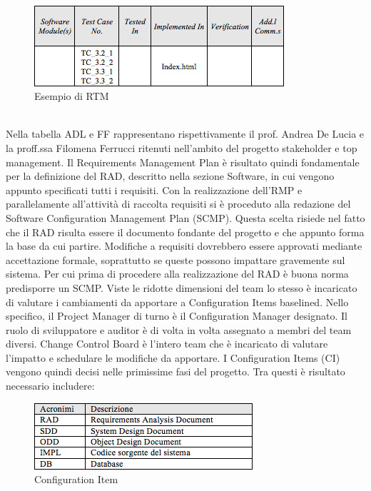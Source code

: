\\
\begin{figure}[h]
\centering
\includegraphics[scale=.7]{img/4.png}
\caption{Esempio di RTM}
\label{fig:cd}
\end{figure}
\\
Nella tabella ADL e FF rappresentano rispettivamente il prof. Andrea De Lucia e la proff.ssa Filomena Ferrucci ritenuti nell\rq ambito del progetto stakeholder e top management.
Il Requirements Management Plan \`{e} risultato quindi fondamentale per la definizione del RAD, descritto nella sezione Software, in cui vengono appunto specificati tutti i requisiti.
Con la realizzazione dell\rq RMP e parallelamente all\rq attivit\`{a} di raccolta requisiti si \`{e} proceduto alla redazione del Software Configuration Management Plan (SCMP). Questa scelta risiede nel fatto che il RAD risulta essere il documento fondante del progetto e che appunto forma la base da cui partire. Modifiche a requisiti dovrebbero essere approvati mediante accettazione formale, soprattutto se queste possono impattare gravemente sul sistema.
Per cui prima di procedere alla realizzazione del RAD \`{e} buona norma predisporre un SCMP. 
Viste le ridotte dimensioni del team lo stesso \`{e} incaricato di valutare i cambiamenti da apportare a Configuration Items baselined.
Nello specifico, il Project Manager di turno \`{e} il Configuration Manager designato. Il ruolo di sviluppatore e auditor \`{e} di volta in volta assegnato a membri del team diversi.
Change Control Board \`{e} l\rq intero team che \`{e} incaricato di valutare l\rq impatto e schedulare le modifiche da apportare.
I Configuration Items (CI) vengono quindi decisi nelle primissime fasi del progetto. Tra questi \`{e} risultato necessario includere: 
\begin{figure}[h]
\centering
\includegraphics[scale=.7]{img/5.png}
\caption{Configuration Item}
\label{fig:cd}
\end{figure}
